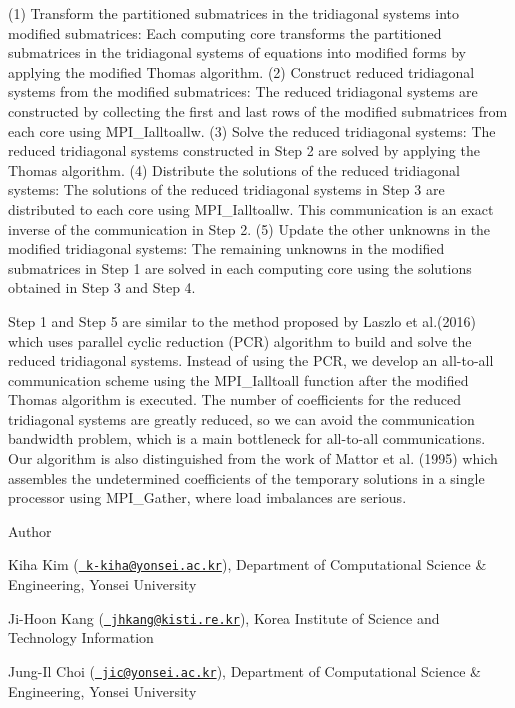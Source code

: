 (1) Transform the partitioned submatrices in the tridiagonal systems into modified submatrices\+: Each computing core transforms the partitioned submatrices in the tridiagonal systems of equations into modified forms by applying the modified Thomas algorithm. (2) Construct reduced tridiagonal systems from the modified submatrices\+: The reduced tridiagonal systems are constructed by collecting the first and last rows of the modified submatrices from each core using M\+P\+I\+\_\+\+Ialltoallw. (3) Solve the reduced tridiagonal systems\+: The reduced tridiagonal systems constructed in Step 2 are solved by applying the Thomas algorithm. (4) Distribute the solutions of the reduced tridiagonal systems\+: The solutions of the reduced tridiagonal systems in Step 3 are distributed to each core using M\+P\+I\+\_\+\+Ialltoallw. This communication is an exact inverse of the communication in Step 2. (5) Update the other unknowns in the modified tridiagonal systems\+: The remaining unknowns in the modified submatrices in Step 1 are solved in each computing core using the solutions obtained in Step 3 and Step 4.

Step 1 and Step 5 are similar to the method proposed by Laszlo et al.(2016) which uses parallel cyclic reduction (P\+CR) algorithm to build and solve the reduced tridiagonal systems. Instead of using the P\+CR, we develop an all-\/to-\/all communication scheme using the M\+P\+I\+\_\+\+Ialltoall function after the modified Thomas algorithm is executed. The number of coefficients for the reduced tridiagonal systems are greatly reduced, so we can avoid the communication bandwidth problem, which is a main bottleneck for all-\/to-\/all communications. Our algorithm is also distinguished from the work of Mattor et al. (1995) which assembles the undetermined coefficients of the temporary solutions in a single processor using M\+P\+I\+\_\+\+Gather, where load imbalances are serious.

\begin{DoxyAuthor}{Author}

\end{DoxyAuthor}

\begin{DoxyItemize}
\item Kiha Kim (\href{mailto:k-kiha@yonsei.ac.kr}{\texttt{ k-\/kiha@yonsei.\+ac.\+kr}}), Department of Computational Science \& Engineering, Yonsei University
\item Ji-\/\+Hoon Kang (\href{mailto:jhkang@kisti.re.kr}{\texttt{ jhkang@kisti.\+re.\+kr}}), Korea Institute of Science and Technology Information
\item Jung-\/\+Il Choi (\href{mailto:jic@yonsei.ac.kr}{\texttt{ jic@yonsei.\+ac.\+kr}}), Department of Computational Science \& Engineering, Yonsei University
\end{DoxyItemize}

